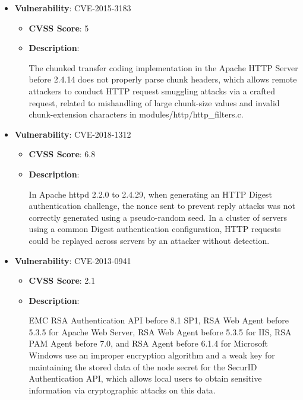 \documentclass{article}
\begin{document}
\begin{itemize}
        \item \textbf{Vulnerability}: CVE-2015-3183
        \begin{itemize}
            \item \textbf{CVSS Score}:  5 
            \item \textbf{Description}:
            \parbox[t]{0.9\linewidth}{
                \ttfamily The chunked transfer coding implementation in the Apache HTTP Server before 2.4.14 does not properly parse chunk headers, which allows remote attackers to conduct HTTP request smuggling attacks via a crafted request, related to mishandling of large chunk-size values and invalid chunk-extension characters in modules/http/http\_filters.c.
            }
        \end{itemize}
    
        \item \textbf{Vulnerability}: CVE-2018-1312
        \begin{itemize}
            \item \textbf{CVSS Score}:  6.8 
            \item \textbf{Description}:
            \parbox[t]{0.9\linewidth}{
                \ttfamily In Apache httpd 2.2.0 to 2.4.29, when generating an HTTP Digest authentication challenge, the nonce sent to prevent reply attacks was not correctly generated using a pseudo-random seed. In a cluster of servers using a common Digest authentication configuration, HTTP requests could be replayed across servers by an attacker without detection.
            }
        \end{itemize}
    
        \item \textbf{Vulnerability}: CVE-2013-0941
        \begin{itemize}
            \item \textbf{CVSS Score}:  2.1 
            \item \textbf{Description}:
            \parbox[t]{0.9\linewidth}{
                \ttfamily EMC RSA Authentication API before 8.1 SP1, RSA Web Agent before 5.3.5 for Apache Web Server, RSA Web Agent before 5.3.5 for IIS, RSA PAM Agent before 7.0, and RSA Agent before 6.1.4 for Microsoft Windows use an improper encryption algorithm and a weak key for maintaining the stored data of the node secret for the SecurID Authentication API, which allows local users to obtain sensitive information via cryptographic attacks on this data.
            }
        \end{itemize}
    

\end{itemize}
\end{document}
